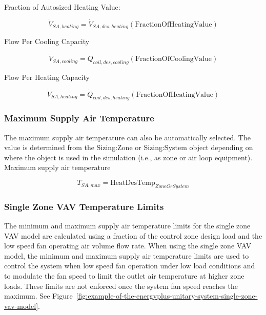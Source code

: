 Fraction of Autosized Heating Value:

\begin{equation}
\dot V_{SA,heating} = \dot V_{SA,des,heating}\left(\text{FractionOfHeatingValue}\right)
\end{equation}

Flow Per Cooling Capacity

\begin{equation}
\dot V_{SA,cooling} = \dot Q_{coil,des,cooling}\left(\text{FractionOfCoolingValue}\right)
\end{equation}

Flow Per Heating Capacity

\begin{equation}
\dot V_{SA,heating} = \dot Q_{coil,des,heating}\left(\text{FractionOfHeatingValue}\right)
\end{equation}

\subsubsection{Maximum Supply Air Temperature}\label{maximum-supply-air-temperature}

The maximum supply air temperature can also be automatically selected. The value is determined from the Sizing:Zone or Sizing:System object depending on where the object is used in the simulation (i.e., as zone or air loop equipment). Maximum supply air temperature

\begin{equation}
T_{SA,max} = \text{HeatDesTemp}_{ZoneOrSystem}
\end{equation}

\subsubsection{Single Zone VAV Temperature Limits}\label{single-zone-vav-temperature-limits}

The minimum and maximum supply air temperature limits for the single zone VAV model are calculated using a fraction of the control zone design load and the low speed fan operating air volume flow rate. When using the single zone VAV model, the minimum and maximum supply air temperature limits are used to control the system when low speed fan operation under low load conditions and to modulate the fan speed to limit the outlet air temperature at higher zone loads. These limits are not enforced once the system fan speed reaches the maximum. See Figure~\ref{fig:example-of-the-energyplus-unitary-system-single-zone-vav-model}.


